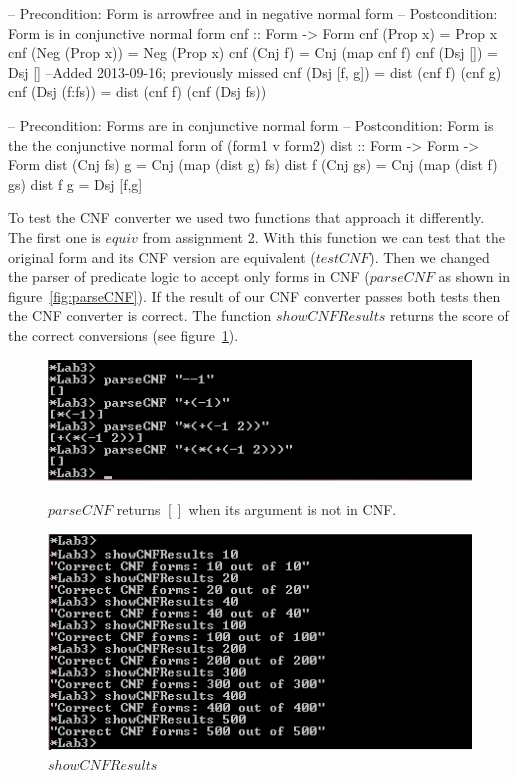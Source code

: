 \documentclass{article}
\begin{document}
\begin{code}
-- Precondition: Form is arrowfree and in negative normal form
-- Postcondition: Form is in conjunctive normal form
cnf :: Form -> Form
cnf (Prop x)		= Prop x
cnf (Neg (Prop x))	= Neg (Prop x)
cnf (Cnj f)		= Cnj (map cnf f)
cnf (Dsj []) = Dsj [] --Added 2013-09-16; previously missed
cnf (Dsj [f, g])	= dist (cnf f) (cnf g)
cnf (Dsj (f:fs))	= dist (cnf f) (cnf (Dsj fs))

-- Precondition: Forms are in conjunctive normal form
-- Postcondition: Form is the the conjunctive normal form of (form1 v form2)
dist :: Form -> Form -> Form
dist (Cnj fs) g 	= Cnj (map (dist g) fs)
dist f (Cnj gs)		= Cnj (map (dist f) gs)
dist f g 		= Dsj [f,g]

\end{code}

To test the CNF converter we used two functions that approach it differently.
The first one is $equiv$ from assignment 2. With this function we can test that
the original form and its CNF version are equivalent ($testCNF$). Then we
changed the parser of predicate logic to accept only forms in CNF ($parseCNF$ as shown in figure~\ref{fig:parseCNF}).
If the result of our CNF converter passes both tests then the CNF converter is
correct. The function $showCNFResults$ returns the score of the correct conversions (see figure~\ref{fig:showCNFResults}).

\begin{figure}[ht]
\begin{minipage}[b]{0.5\linewidth}
\centering
\includegraphics[width=\textwidth]{parseCNF.jpg}
\caption{$parseCNF$ returns $[]$ when its argument is not in CNF.}
\label{fig:parseCNF}
\end{minipage}
\hspace{0.5cm}
\begin{minipage}[b]{0.5\linewidth}
\centering
\includegraphics[width=\textwidth]{CNFtest.jpg}
\caption{$showCNFResults$}
\label{fig:showCNFResults}
\end{minipage}
\end{figure}
\end{document}
